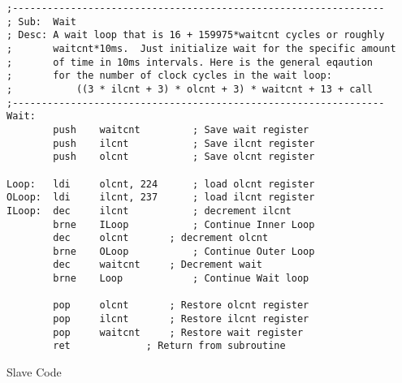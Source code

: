 \documentclass[12pt,letterpaper]{article}
\begin{document}
\begin{verbatim}
;----------------------------------------------------------------
; Sub:  Wait
; Desc: A wait loop that is 16 + 159975*waitcnt cycles or roughly 
;       waitcnt*10ms.  Just initialize wait for the specific amount 
;       of time in 10ms intervals. Here is the general eqaution
;       for the number of clock cycles in the wait loop:
;           ((3 * ilcnt + 3) * olcnt + 3) * waitcnt + 13 + call
;----------------------------------------------------------------
Wait:
        push    waitcnt         ; Save wait register
        push    ilcnt           ; Save ilcnt register
        push    olcnt           ; Save olcnt register

Loop:   ldi     olcnt, 224      ; load olcnt register
OLoop:  ldi     ilcnt, 237      ; load ilcnt register
ILoop:  dec     ilcnt           ; decrement ilcnt
        brne    ILoop           ; Continue Inner Loop
        dec     olcnt       ; decrement olcnt
        brne    OLoop           ; Continue Outer Loop
        dec     waitcnt     ; Decrement wait 
        brne    Loop            ; Continue Wait loop    

        pop     olcnt       ; Restore olcnt register
        pop     ilcnt       ; Restore ilcnt register
        pop     waitcnt     ; Restore wait register
        ret             ; Return from subroutine
\end{verbatim}
Slave Code
\end{document}
